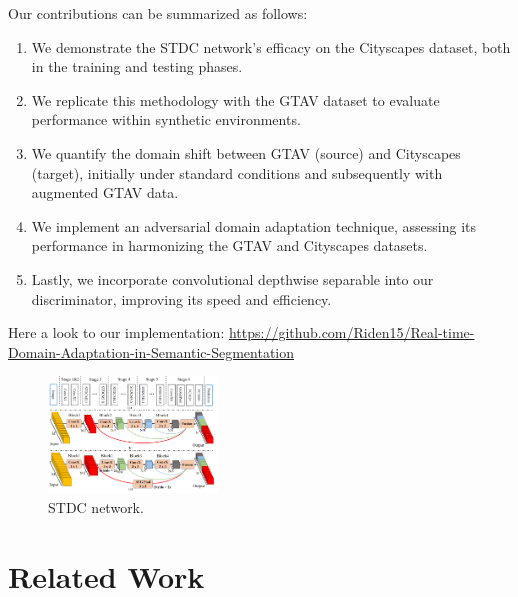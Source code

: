 \documentclass[conference]{IEEEtran}
\begin{document}
Our contributions can be summarized as follows:
\begin{enumerate}
    \item We demonstrate the STDC network's efficacy on the Cityscapes dataset, both in the training and testing phases.
    \item We replicate this methodology with the GTAV dataset to evaluate performance within synthetic environments.
    \item We quantify the domain shift between GTAV (source) and Cityscapes (target), initially under standard conditions and subsequently with augmented GTAV data.
    \item We implement an adversarial domain adaptation technique, assessing its performance in harmonizing the GTAV and Cityscapes datasets.
    \item Lastly, we incorporate convolutional depthwise separable into our discriminator, improving its speed and efficiency.
\end{enumerate}

Here a look to our implementation: \url{https://github.com/Riden15/Real-time-Domain-Adaptation-in-Semantic-Segmentation}

\begin{figure}[t]
\centerline{\includegraphics[width=0.4\textwidth]{figures/Figure1-STDCnet}}
\caption{STDC network.}
\label{fig:stdc_net}
\end{figure}

\section{Related Work}
\end{document}
